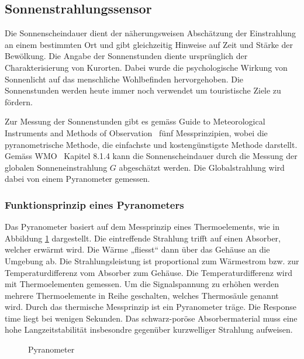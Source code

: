\subsection{Sonnenstrahlungssensor}
Die Sonnenscheindauer dient der näherungsweisen Abschätzung der Einstrahlung an einem bestimmten Ort und gibt gleichzeitig Hinweise auf Zeit und Stärke der Bewölkung. Die Angabe der Sonnenstunden diente ursprünglich der Charakterisierung von Kurorten. Dabei wurde die psychologische Wirkung von Sonnenlicht auf das menschliche Wohlbefinden hervorgehoben. Die Sonnenstunden werden heute immer noch verwendet um touristische Ziele zu fördern.

\noindent
Zur Messung der Sonnenstunden gibt es gemäss  \flqq Guide to Meteorological Instruments and Methods of Observation\frqq ~\cite{WMO2014Gtmi}  fünf Messprinzipien, wobei die pyranometrische Methode, die einfachste und kostengünstigste Methode darstellt. Gemäss WMO~\cite{WMO2014Gtmi} Kapitel 8.1.4 kann die Sonnenscheindauer durch die Messung der globalen Sonneneinstrahlung $G$ abgeschätzt werden. Die Globalstrahlung wird dabei von einem Pyranometer gemessen.

\subsubsection{Funktionsprinzip eines Pyranometers}
Das Pyranometer basiert auf dem Messprinzip eines Thermoelements, wie in Abbildung \ref{img:pyranometer}  dargestellt. Die eintreffende Strahlung trifft auf einen Absorber, welcher erwärmt wird. Die Wärme „fliesst“ dann über das Gehäuse an die Umgebung ab. Die Strahlungsleistung ist proportional zum Wärmestrom bzw. zur Temperaturdifferenz vom Absorber zum Gehäuse. Die Temperaturdifferenz wird mit Thermoelementen gemessen. Um die Signalspannung zu erhöhen werden mehrere Thermoelemente in Reihe geschalten, welches Thermosäule genannt wird. Durch das thermische Messprinzip ist ein Pyranometer träge. Die Response time liegt bei wenigen Sekunden. Das schwarz-poröse Absorbermaterial muss eine hohe Langzeitstabilität insbesondre gegenüber kurzwelliger Strahlung aufweisen.

\begin{figure}[ht]
	\centering
	\caption{Pyranometer}
	\label{img:pyranometer}
\end{figure}

